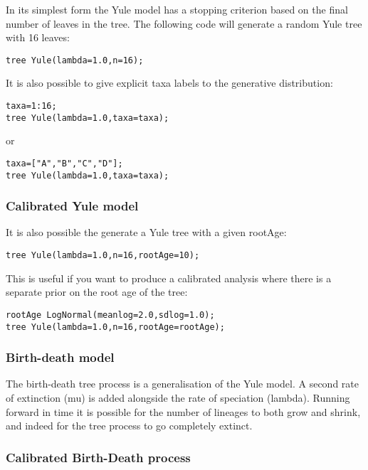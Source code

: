 \documentclass[10pt,letterpaper,table]{article}
\begin{document}
In its simplest form the Yule model has a stopping criterion based on the final number of leaves in the tree.
The following code will generate a random Yule tree with 16 leaves:

\begin{alltt}
  tree ~ Yule(lambda=1.0, n=16);
\end{alltt}

It is also possible to give explicit taxa labels to the generative distribution:

\begin{alltt}
  taxa = 1:16;
  tree ~ Yule(lambda=1.0, taxa=taxa);
\end{alltt}

or

\begin{alltt}
  taxa = ["A", "B", "C", "D"];
  tree ~ Yule(lambda=1.0, taxa=taxa);
\end{alltt}

\subsubsection*{Calibrated Yule model}

It is also possible the generate a Yule tree with a given rootAge:

\begin{alltt}
  tree ~ Yule(lambda=1.0, n=16, rootAge=10);
\end{alltt}

This is useful if you want to produce a calibrated analysis where there is a separate prior on the root age of the tree:

\begin{alltt}
  rootAge ~ LogNormal(meanlog=2.0, sdlog=1.0);
  tree ~ Yule(lambda=1.0, n=16, rootAge=rootAge);
\end{alltt}

\subsubsection*{Birth-death model}

The birth-death tree process is a generalisation of the Yule model. A second rate of extinction (mu) is added alongside
the rate of speciation (lambda). Running forward in time it is possible for the number of lineages to both grow and
shrink, and indeed for the tree process to go completely extinct.

\subsubsection*{Calibrated Birth-Death process}
\end{document}
